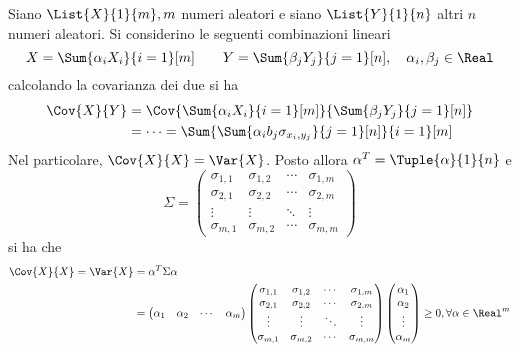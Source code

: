 \documentclass{subfiles}
\begin{document}
Siano $\List{X}{1}{m}, m$ numeri aleatori e siano $\List{Y}{1}{n}$ altri $n$ numeri aleatori.
Si considerino le seguenti combinazioni lineari
$$
    X = \Sum{\alpha_{i} X_{i}}{i = 1}[m] \qquad Y = \Sum{\beta_{j} Y_{j}}{j = 1}[n], \quad \alpha_{i}, \beta_{j} \in \Real
$$
calcolando la covarianza dei due si ha
$$\begin{aligned}
        \Cov{X}{Y} & = \Cov{\Sum{\alpha_{i} X_{i}}{i = 1}[m]}{\Sum{\beta_{j} Y_{j}}{j = 1}[n]}        \\
                   & = \cdots = \Sum{\Sum{\alpha_{i}b_{j} \sigma_{x_{i}, y_{j}}}{j = 1}[n]}{i = 1}[m]
    \end{aligned}$$
Nel particolare, $\Cov{X}{X} = \Var{X}$.
Posto allora $\alpha^{T} = \Tuple{\alpha}{1}{n}$ e
$$
    \Sigma = \begin{pmatrix}
        \sigma_{1,1} & \sigma_{1,2}  & \cdots & \sigma_{1, m} \\
        \sigma_{2,1} & \sigma_{2,2}  & \cdots & \sigma_{2, m} \\
        \vdots       & \vdots        & \ddots & \vdots        \\
        \sigma_{m,1} & \sigma_{m, 2} & \cdots & \sigma_{m,m}
    \end{pmatrix}$$
si ha che
$$\begin{aligned}
        \Cov{X}{X} = \Var{X} & = \alpha^{T} \Sigma \alpha                                                      \\
                             & = \begin{pmatrix}
                                     \alpha_{1} & \alpha_{2} & \cdots & \alpha_{m}
                                 \end{pmatrix} \begin{pmatrix}
                                                   \sigma_{1,1} & \sigma_{1,2}  & \cdots & \sigma_{1, m} \\
                                                   \sigma_{2,1} & \sigma_{2,2}  & \cdots & \sigma_{2, m} \\
                                                   \vdots       & \vdots        & \ddots & \vdots        \\
                                                   \sigma_{m,1} & \sigma_{m, 2} & \cdots & \sigma_{m,m}
                                               \end{pmatrix} \begin{pmatrix}
                                                                 \alpha_{1} \\
                                                                 \alpha_{2} \\
                                                                 \vdots     \\
                                                                 \alpha_{m}
                                                             \end{pmatrix} \ge 0, \forall \alpha \in \Real^{m}
    \end{aligned}$$
\end{document}
